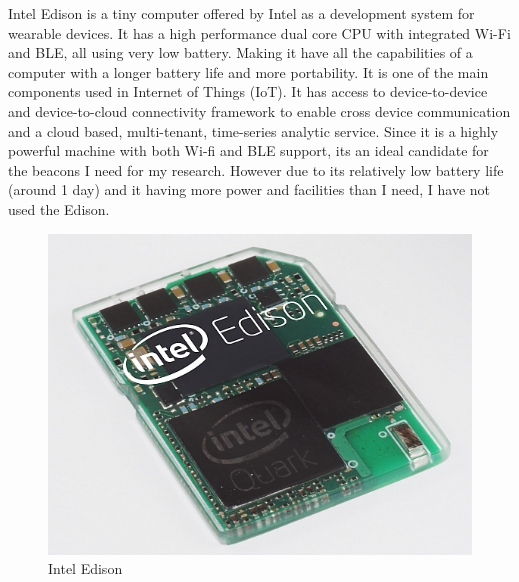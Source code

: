 Intel Edison\cite{intel-edision} is a tiny computer offered by Intel
as a development system for wearable devices. It has a high performance
dual core CPU with integrated Wi-Fi and BLE, all using very low battery.
Making it have all the capabilities of a computer with a longer battery
life and more portability. It is one of the main components used in
Internet of Things (IoT). It has access to device-to-device and device-to-cloud
connectivity framework to enable cross device communication and a
cloud based, multi-tenant, time-series analytic service. Since it
is a highly powerful machine with both Wi-fi and BLE support, its
an ideal candidate for the beacons I need for my research. However
due to its relatively low battery life (around 1 day) and it having
more power and facilities than I need, I have not used the Edison.

\begin{figure}[H]
\includegraphics{images/intel-edison-560}

\protect\caption{Intel Edison}


\end{figure}


